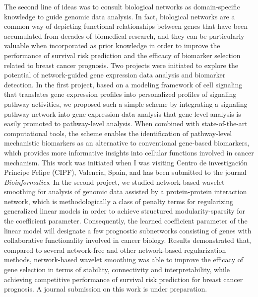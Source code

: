 The second line of ideas was to consult biological networks as domain-specific knowledge to guide genomic data analysis. In fact, biological networks are a common way of depicting functional relationships between genes that have been accumulated from decades of biomedical research, and they can be particularly valuable when incorporated as prior knowledge in order to improve the performance of survival risk prediction and the efficacy of biomarker selection related to breast cancer prognosis. Two projects were initiated to explore the potential of network-guided gene expression data analysis and biomarker detection. In the first project, based on a modeling framework of cell signaling that translates gene expression profiles into personalized profiles of signaling pathway activities, we proposed such a simple scheme by integrating a signaling pathway network into gene expression data analysis that gene-level analysis is easily promoted to pathway-level analysis. When combined with state-of-the-art computational tools, the scheme enables the identification of pathway-level mechanistic biomarkers as an alternative to conventional gene-based biomarkers, which provides more informative insights into cellular functions involved in cancer mechanism. This work was initiated when I was visiting Centro de investigaci\'{o}n Pr\'{i}ncipe Felipe (CIPF), Valencia, Spain, and has been submitted to the journal \textit{Bioinformatics}. In the second project, we studied network-based wavelet smoothing for analysis of genomic data assisted by a protein-protein interaction network, which is methodologically a class of penalty terms for regularizing generalized linear models in order to achieve structured modularity-sparsity for the coefficient parameter. Consequently, the learned coefficient parameter of the linear model will designate a few prognostic subnetworks consisting of genes with collaborative functionality involved in cancer biology. Results demonstrated that, compared to several network-free and other network-based regularization methods, network-based wavelet smoothing was able to improve the efficacy of gene selection in terms of stability, connectivity and interpretability, while achieving competitive performance of survival risk prediction for breast cancer prognosis. A journal submission on this work is under preparation.

